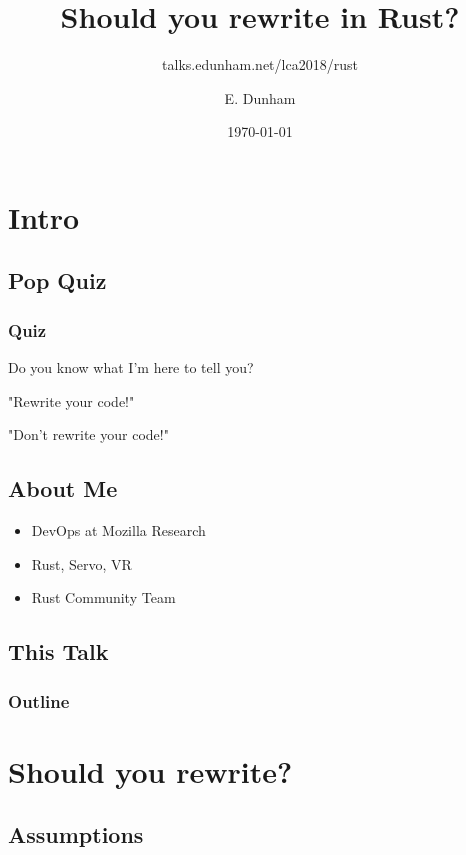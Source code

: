 \documentclass{beamer}
\title{Should you rewrite in Rust?}
\subtitle{talks.edunham.net/lca2018/rust}
\author{E. Dunham}
\institute{LinuxConf Australia}
\date{\today}
\begin{document}
\begin{frame}[fragile]
\titlepage
\end{frame}


\section{Intro}
\subsection{Pop Quiz}

\begin{frame}[fragile]
\frametitle{Quiz}
Do you know what I'm here to tell you?
\end{frame}

\begin{frame}[fragile]
"Rewrite your code!"
\end{frame}


\begin{frame}[fragile]
"Don't rewrite your code!"
\end{frame}

\subsection{About Me}

\begin{frame}[fragile]
\begin{itemize}
\item DevOps at Mozilla Research
\item Rust, Servo, VR
\item Rust Community Team
\end{itemize}
\end{frame}

\subsection{This Talk}

\begin{frame}[fragile]
\frametitle{Outline}
\tableofcontents
\end{frame}

\section{Should you rewrite?}
\subsection{Assumptions}
\end{document}
